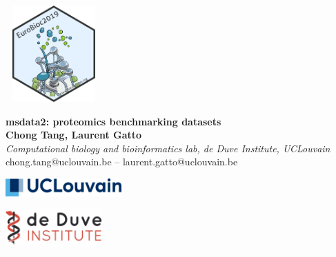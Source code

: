 \documentclass{article}
\title{}
\author{}
\date{}
\begin{document}


\begin{center}
  \colorbox{lgray}{
    \begin{minipage}{3cm}
      \includegraphics[width=10em,height=10em]{pix/sticker2019.png}
    \end{minipage}

  \begin{minipage}{.74\textwidth}
    \begin{center}
      \huge \textbf{msdata2: proteomics benchmarking datasets } \\
      \vspace{0.4cm}
      \Large \textbf{Chong Tang, Laurent Gatto} \\
      \Large \textit{Computational biology and bioinformatics lab, de Duve Institute, UCLouvain } \\
      \vspace{0.4cm}
      \normalsize chong.tang@uclouvain.be -- laurent.gatto@uclouvain.be \\
    \end{center}
  \end{minipage}
  \begin{minipage}{5cm}
    \includegraphics[width=12em]{pix/ucllogo.png} \\
    \includegraphics[width=10em]{pix/Institut_de_Duve.png}
  \end{minipage}
}
\end{center}


\end{document}
